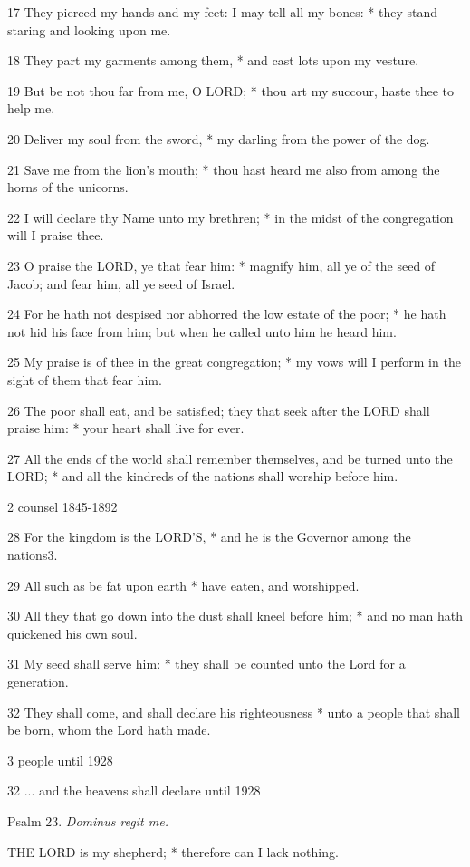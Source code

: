 17 They pierced my hands and my feet: I may tell all
my bones: * they stand staring and looking upon me.

18 They part my garments among them, * and cast lots
upon my vesture.

19 But be not thou far from me, O LORD;
* thou art my succour, haste thee to help me.

20
Deliver my soul from the sword, * my darling from the power of the dog.

21 Save me from the lion's mouth; * thou hast heard
me also from among the horns of the unicorns.

22 I will declare thy Name unto my brethren; * in the
midst of the congregation will I praise thee.

23 O praise the LORD, ye that
fear him: * magnify him, all ye of the seed of Jacob; and fear him, all
ye seed of Israel.

24 For he hath not despised nor abhorred the low estate
of the poor; * he hath not hid his face from him; but when he called unto
him he heard him.

25 My praise is of thee in the great congregation;
* my vows will I perform in the sight of them that fear him.

26 The poor shall eat, and be satisfied; they that
seek after the LORD shall praise him: * your heart
shall live for ever.

27 All the ends of the world shall remember themselves,
and be turned unto the LORD; * and all the kindreds
of the nations shall worship before him.

2 counsel 1845-1892

28 For the kingdom is the LORD’S,
* and he is the Governor among the nations3.

29 All such as be fat upon earth * have eaten, and worshipped.

30 All they that go down into the dust shall kneel before
him; * and no man hath quickened his own soul.

31 My seed shall serve him: * they shall be counted unto
the Lord for a generation.

32 They shall come, and shall declare his righteousness
* unto a people that shall be born, whom the Lord hath made.

3 people
until 1928

32 ... and the heavens shall declare
until 1928

Psalm
23. \emph{Dominus regit me.}

THE
LORD is my shepherd; * therefore can I lack nothing.

